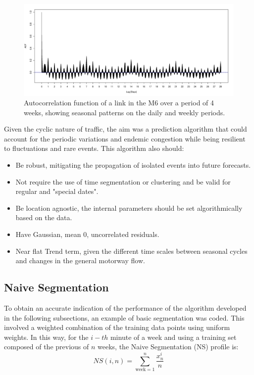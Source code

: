 \documentclass[conference, letterpaper]{IEEEtran}
\begin{document}
\begin{figure}[htbp]
	\centerline{\includegraphics[width=\linewidth]{./images/finalplots/ACF_M6_Link3.pdf}}
	\caption{Autocorrelation function of a link in the M6 over a period of 4 weeks, showing seasonal patterns on the daily and weekly periods.}
	\label{fig:acf}
\end{figure}

Given the cyclic nature of traffic, the aim was a prediction algorithm that could account for the periodic variations and endemic congestion while being resilient to fluctuations and rare events. This algorithm also should:
\begin{itemize}
	\item Be robust, mitigating the propagation of isolated events into future forecasts.
	\item Not require the use of time segmentation or clustering and be valid for regular and "special dates".
	\item Be location agnostic, the internal parameters should be set algorithmically based on the data.
	\item Have Gaussian, mean 0, uncorrelated residuals.
	\item Near flat Trend term, given the different time scales between seasonal cycles and changes in the general motorway flow.
\end{itemize}

\subsection{Naive Segmentation}
To obtain an accurate indication of the performance of the algorithm developed in the following subsections, an example of basic segmentation was coded. 
This involved a weighted combination of the training data points using uniform weights. 
In this way, for the $i-th$ minute of a week and using a training set composed of the previous of $n$ weeks, the Naive Segmentation (NS) profile is:
\begin{equation}
NS(i,n) = \sum_{\textrm{week}=1}^{n} \frac{x^i_n}{n} 
\end{equation}
\end{document}
